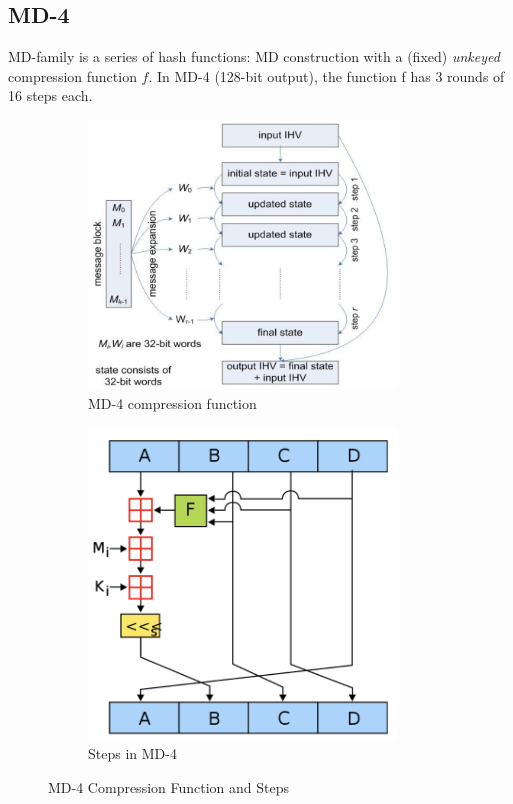 \subsection{MD-4}
MD-family is a series of hash functions: MD construction with a (fixed) \emph{unkeyed} compression function $f$. 
In MD-4 (128-bit output), the function f has 3 rounds of 16 steps each.

\begin{figure}[h!]
    \centering
    \begin{subfigure}{0.4\textwidth}
        \centering
        \includegraphics[width=0.9\textwidth]{img/md4.png}
        \caption{MD-4 compression function}
    \end{subfigure}
    \hfill
    \begin{subfigure}{0.4\textwidth}
        \centering
        \includegraphics[width=0.9\textwidth]{img/md4steps.png}
        \caption{Steps in MD-4}
    \end{subfigure}
    \caption{MD-4 Compression Function and Steps}
\end{figure}

